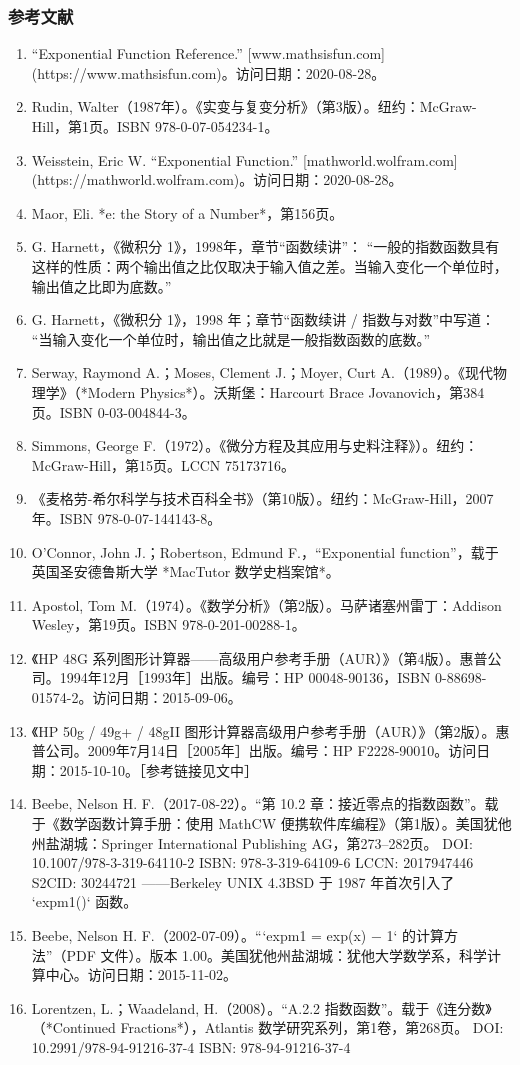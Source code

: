 \subsubsection{参考文献}
\begin{enumerate}
\item “Exponential Function Reference.” [www.mathsisfun.com](https://www.mathsisfun.com)。访问日期：2020-08-28。
\item Rudin, Walter（1987年）。《实变与复变分析》（第3版）。纽约：McGraw-Hill，第1页。ISBN 978-0-07-054234-1。
\item Weisstein, Eric W. “Exponential Function.” [mathworld.wolfram.com](https://mathworld.wolfram.com)。访问日期：2020-08-28。
\item Maor, Eli. *e: the Story of a Number*，第156页。
\item G. Harnett，《微积分 1》，1998年，章节“函数续讲”：
  “一般的指数函数具有这样的性质：两个输出值之比仅取决于输入值之差。当输入变化一个单位时，输出值之比即为底数。”
\item G. Harnett，《微积分 1》，1998 年；章节“函数续讲 / 指数与对数”中写道：
“当输入变化一个单位时，输出值之比就是一般指数函数的底数。”
\item Serway, Raymond A.；Moses, Clement J.；Moyer, Curt A.（1989）。《现代物理学》（*Modern Physics*）。沃斯堡：Harcourt Brace Jovanovich，第384页。ISBN 0-03-004844-3。
\item Simmons, George F.（1972）。《微分方程及其应用与史料注释》）。纽约：McGraw-Hill，第15页。LCCN 75173716。
\item 《麦格劳-希尔科学与技术百科全书》（第10版）。纽约：McGraw-Hill，2007年。ISBN 978-0-07-144143-8。
\item O'Connor, John J.；Robertson, Edmund F.，“Exponential function”，载于英国圣安德鲁斯大学 *MacTutor 数学史档案馆*。
\item Apostol, Tom M.（1974）。《数学分析》（第2版）。马萨诸塞州雷丁：Addison Wesley，第19页。ISBN 978-0-201-00288-1。
\item 《HP 48G 系列图形计算器——高级用户参考手册（AUR）》（第4版）。惠普公司。1994年12月［1993年］出版。编号：HP 00048-90136，ISBN 0-88698-01574-2。访问日期：2015-09-06。
\item 《HP 50g / 49g+ / 48gII 图形计算器高级用户参考手册（AUR）》（第2版）。惠普公司。2009年7月14日［2005年］出版。编号：HP F2228-90010。访问日期：2015-10-10。［参考链接见文中］
\item Beebe, Nelson H. F.（2017-08-22）。“第 10.2 章：接近零点的指数函数”。载于《数学函数计算手册：使用 MathCW 便携软件库编程》（第1版）。美国犹他州盐湖城：Springer International Publishing AG，第273–282页。
  DOI: 10.1007/978-3-319-64110-2
  ISBN: 978-3-319-64109-6
  LCCN: 2017947446
  S2CID: 30244721
  ——Berkeley UNIX 4.3BSD 于 1987 年首次引入了 `expm1()` 函数。
\item Beebe, Nelson H. F.（2002-07-09）。“`expm1 = exp(x) − 1` 的计算方法”（PDF 文件）。版本 1.00。美国犹他州盐湖城：犹他大学数学系，科学计算中心。访问日期：2015-11-02。
\item Lorentzen, L.；Waadeland, H.（2008）。“A.2.2 指数函数”。载于《连分数》（*Continued Fractions*），Atlantis 数学研究系列，第1卷，第268页。
  DOI: 10.2991/978-94-91216-37-4
  ISBN: 978-94-91216-37-4
\end{enumerate}
